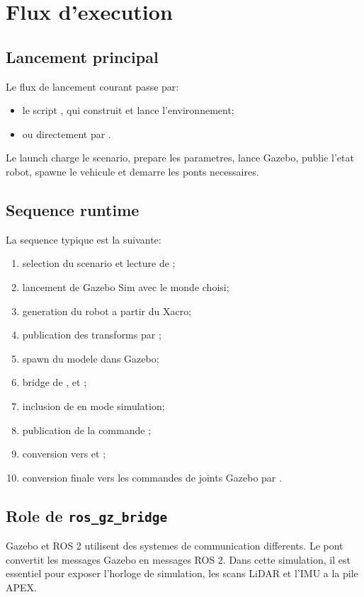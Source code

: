 \section{Flux d'execution}

\subsection{Lancement principal}

Le flux de lancement courant passe par:

\begin{itemize}
  \item le script , qui construit et lance l'environnement;
  \item ou directement par .
\end{itemize}

Le launch  charge le scenario, prepare les parametres, lance Gazebo, publie l'etat robot, spawne le vehicule et demarre les ponts necessaires.

\subsection{Sequence runtime}

La sequence typique est la suivante:

\begin{enumerate}
  \item selection du scenario et lecture de ;
  \item lancement de Gazebo Sim avec le monde choisi;
  \item generation du robot a partir du Xacro;
  \item publication des transforms par ;
  \item spawn du modele dans Gazebo;
  \item bridge de ,  et ;
  \item inclusion de  en mode simulation;
  \item publication de la commande ;
  \item conversion vers  et ;
  \item conversion finale vers les commandes de joints Gazebo par .
\end{enumerate}

\subsection{Role de \texttt{ros\_gz\_bridge}}

Gazebo et ROS 2 utilisent des systemes de communication differents. Le pont  convertit les messages Gazebo en messages ROS 2. Dans cette simulation, il est essentiel pour exposer l'horloge de simulation, les scans LiDAR et l'IMU a la pile APEX.
